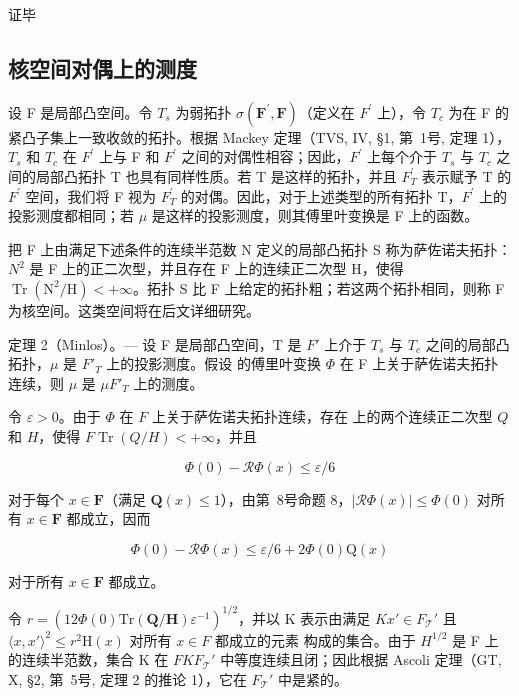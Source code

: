 证毕

\subsection{核空间对偶上的测度}

设 F 是局部凸空间。令 \(T_{s}\) 为弱拓扑 \(\sigma(\mathbf{F}^{\prime},\mathbf{F})\)（定义在 \(F^{\prime}\) 上），令 \(T_{c}\) 为在 F 的紧凸子集上一致收敛的拓扑。根据 Mackey 定理（TVS, IV, §1, 第~1号, 定理 1），\(T_{s}\) 和 \(T_{c}\) 在 \(F^{\prime}\) 上与 F 和 \(F^{\prime}\) 之间的对偶性相容；因此，\(F^{\prime}\) 上每个介于 \(T_{s}\) 与 \(T_{c}\) 之间的局部凸拓扑 T 也具有同样性质。若 T 是这样的拓扑，并且 \(F^{\prime}_{T}\) 表示赋予 T 的 \(F^{\prime}\) 空间，我们将 F 视为 \(F^{\prime}_{T}\) 的对偶。因此，对于上述类型的所有拓扑 T，\(F^{\prime}\) 上的投影测度都相同；若 \(\mu\) 是这样的投影测度，则其傅里叶变换是 F 上的函数。

把 F 上由满足下述条件的连续半范数 N 定义的局部凸拓扑 S 称为萨佐诺夫拓扑：\(N^{2}\) 是 F 上的正二次型，并且存在 F 上的连续正二次型 H，使得 \(\operatorname{Tr}\left(\mathrm{N}^{2}/\mathrm{H}\right)<+\infty\)。拓扑 S 比 F 上给定的拓扑粗；若这两个拓扑相同，则称 F 为核空间。这类空间将在后文详细研究。

定理 2（Minlos）。--- 设 F 是局部凸空间，T 是 \(F'\) 上介于 \(T_{s}\) 与 \(T_{c}\) 之间的局部凸拓扑，\(\mu\) 是 \(F'_{T}\) 上的投影测度。假设  的傅里叶变换 \(\Phi\) 在 F 上关于萨佐诺夫拓扑连续，则 \(\mu\) 是 \(\mu\)\(F'_{T}\) 上的测度。

令 \(\varepsilon > 0\)。由于 \(\Phi\) 在 \(F\) 上关于萨佐诺夫拓扑连续，存在  上的两个连续正二次型 \(Q\) 和 \(H\)，使得 \(F\)\(\operatorname{Tr}(Q / H) < +\infty\)，并且

\[
\Phi (0) - \mathcal {R} \Phi (x) \leqslant \varepsilon / 6
\]

对于每个 \(x \in \mathbf{F}\)（满足 \(\mathbf{Q}(x) \leqslant 1\)），由第~8号命题 8，\(|\mathcal{R}\Phi(x)| \leqslant \Phi(0)\) 对所有 \(x \in \mathbf{F}\) 都成立，因而

\[
\Phi (0) - \mathcal {R} \Phi (x) \leqslant \varepsilon / 6 + 2 \Phi (0) \mathrm{Q} (x)\tag{63}
\]

对于所有 \(x \in \mathbf{F}\) 都成立。

令 \(r = \left(12\Phi(0)\mathrm{Tr}(\mathbf{Q}/\mathbf{H})\varepsilon^{-1}\right)^{1/2}\)，并以 K 表示由满足 \(K\)\(x' \in F_{\mathcal{T}}'\) 且 \(\langle x, x' \rangle^2 \leqslant r^2\mathrm{H}(x)\) 对所有 \(x \in F\) 都成立的元素  构成的集合。由于 \(H^{1/2}\) 是 F 上的连续半范数，集合 K 在 \(F\)\(K\)\(F_{\mathcal{T}}'\) 中等度连续且闭；因此根据 Ascoli 定理（GT, X, §2, 第~5号, 定理 2 的推论 1），它在 \(F_{\mathcal{T}}'\) 中是紧的。

